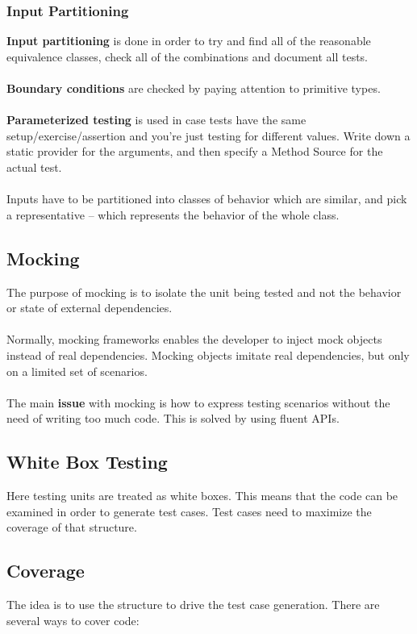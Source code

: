 \documentclass{article}
\begin{document}
\subsubsection{Input Partitioning}
\textbf{Input partitioning} is done in order to try and find all of the reasonable equivalence classes, check all of the combinations and document all tests. \\ \\
\textbf{Boundary conditions} are checked by paying attention to primitive types. \\ \\
\textbf{Parameterized testing} is used in case tests have the same setup/exercise/assertion and you're just testing for different values. Write down a static provider for the arguments, and then specify a Method Source for the actual test. \\ \\
Inputs have to be partitioned into classes of behavior which are similar, and pick a representative -- which represents the behavior of the whole class.

\subsection{Mocking}
The purpose of mocking is to isolate the unit being tested and not the behavior or state of external dependencies. \\ \\
Normally, mocking frameworks enables the developer to inject mock objects instead of real dependencies. Mocking objects imitate real dependencies, but only on a limited set of scenarios. \\ \\
The main \textbf{issue} with mocking is how to express testing scenarios without the need of writing too much code. This is solved by using fluent APIs.

\subsection{White Box Testing}
Here testing units are treated as white boxes. This means that the code can be examined in order to generate test cases. Test cases need to maximize the coverage of that structure.

\subsection{Coverage}
The idea is to use the structure to drive the test case generation. There are several ways to cover code:
\end{document}
